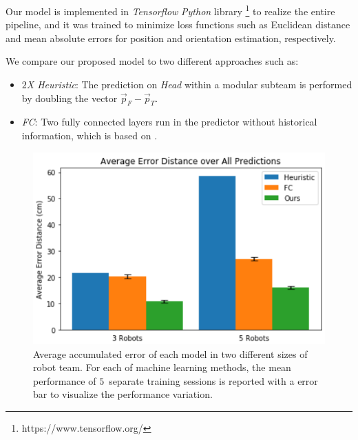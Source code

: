 \documentclass[letterpaper, 10 pt, conference]{ieeeconf}  %
\begin{document}
	Our model is implemented in \emph{Tensorflow} \emph{Python} library \footnote{https://www.tensorflow.org/}
	to realize the entire pipeline, and it was trained to minimize
	loss functions such as Euclidean distance and mean absolute errors
	for position and orientation estimation, respectively.

	We compare our proposed model to two different approaches such as:
	\begin{itemize}
		\item \emph{$2$X Heuristic}:
		The prediction on \emph{Head} within a modular subteam is performed by doubling the vector
		$\vec{p}_{F} - \vec{p}_{T}$.

		\item \emph{FC}:
		Two fully connected layers run in the predictor without historical
		information, which is based on \cite{CPR17}.

	\end{itemize}




	\begin{figure}[t]
	\centering
	\includegraphics[width=1.\columnwidth]{fig_macro_eval}
	\caption{Average accumulated error of each model in two different sizes of robot team.
		For each of machine learning methods, the mean performance of $5$~separate training
		sessions is reported with a error bar to visualize the performance variation.
	}
	\label{fig:macro_eval}
	\end{figure}
\end{document}
